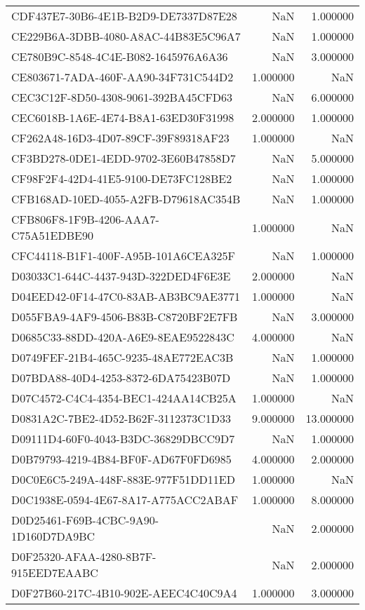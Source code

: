 \begin{tabular}{lrr}
CDF437E7-30B6-4E1B-B2D9-DE7337D87E28 & NaN & 1.000000 \\
CE229B6A-3DBB-4080-A8AC-44B83E5C96A7 & NaN & 1.000000 \\
CE780B9C-8548-4C4E-B082-1645976A6A36 & NaN & 3.000000 \\
CE803671-7ADA-460F-AA90-34F731C544D2 & 1.000000 & NaN \\
CEC3C12F-8D50-4308-9061-392BA45CFD63 & NaN & 6.000000 \\
CEC6018B-1A6E-4E74-B8A1-63ED30F31998 & 2.000000 & 1.000000 \\
CF262A48-16D3-4D07-89CF-39F89318AF23 & 1.000000 & NaN \\
CF3BD278-0DE1-4EDD-9702-3E60B47858D7 & NaN & 5.000000 \\
CF98F2F4-42D4-41E5-9100-DE73FC128BE2 & NaN & 1.000000 \\
CFB168AD-10ED-4055-A2FB-D79618AC354B & NaN & 1.000000 \\
CFB806F8-1F9B-4206-AAA7-C75A51EDBE90 & 1.000000 & NaN \\
CFC44118-B1F1-400F-A95B-101A6CEA325F & NaN & 1.000000 \\
D03033C1-644C-4437-943D-322DED4F6E3E & 2.000000 & NaN \\
D04EED42-0F14-47C0-83AB-AB3BC9AE3771 & 1.000000 & NaN \\
D055FBA9-4AF9-4506-B83B-C8720BF2E7FB & NaN & 3.000000 \\
D0685C33-88DD-420A-A6E9-8EAE9522843C & 4.000000 & NaN \\
D0749FEF-21B4-465C-9235-48AE772EAC3B & NaN & 1.000000 \\
D07BDA88-40D4-4253-8372-6DA75423B07D & NaN & 1.000000 \\
D07C4572-C4C4-4354-BEC1-424AA14CB25A & 1.000000 & NaN \\
D0831A2C-7BE2-4D52-B62F-3112373C1D33 & 9.000000 & 13.000000 \\
D09111D4-60F0-4043-B3DC-36829DBCC9D7 & NaN & 1.000000 \\
D0B79793-4219-4B84-BF0F-AD67F0FD6985 & 4.000000 & 2.000000 \\
D0C0E6C5-249A-448F-883E-977F51DD11ED & 1.000000 & NaN \\
D0C1938E-0594-4E67-8A17-A775ACC2ABAF & 1.000000 & 8.000000 \\
D0D25461-F69B-4CBC-9A90-1D160D7DA9BC & NaN & 2.000000 \\
D0F25320-AFAA-4280-8B7F-915EED7EAABC & NaN & 2.000000 \\
D0F27B60-217C-4B10-902E-AEEC4C40C9A4 & 1.000000 & 3.000000 \\

\end{tabular}
